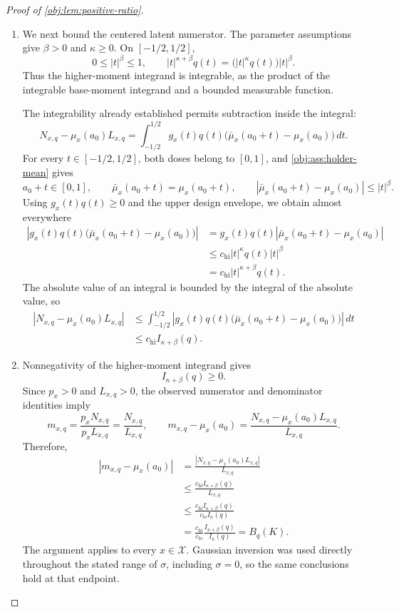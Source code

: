 \begin{proof}[Proof of \cref{obj:lem:positive-ratio}]
\begin{enumerate}
\item We next bound the centered latent numerator. The parameter assumptions give \(\beta>0\) and \(\kappa\ge0\). On \([-1/2,1/2]\),
\[
0\le |t|^\beta\le1,
\qquad
|t|^{\kappa+\beta}q(t)
=
\bigl(|t|^\kappa q(t)\bigr)|t|^\beta.
\]
Thus the higher-moment integrand is integrable, as the product of the integrable base-moment integrand and a bounded measurable function.

The integrability already established permits subtraction inside the integral:
\[
N_{x,q}-\mu_x(a_0)L_{x,q}
=
\int_{-1/2}^{1/2}
g_x(t)q(t)\bigl(\bar\mu_x(a_0+t)-\mu_x(a_0)\bigr)\,dt.
\]
For every \(t\in[-1/2,1/2]\), both doses belong to \([0,1]\), and \cref{obj:ass:holder-mean} gives
\[
a_0+t\in[0,1],
\qquad
\bar\mu_x(a_0+t)=\mu_x(a_0+t),
\qquad
|\bar\mu_x(a_0+t)-\mu_x(a_0)|\le |t|^\beta.
\]
Using \(g_x(t)q(t)\ge0\) and the upper design envelope, we obtain almost everywhere
\[
\begin{aligned}
\left|g_x(t)q(t)
\bigl(\bar\mu_x(a_0+t)-\mu_x(a_0)\bigr)\right|
&=g_x(t)q(t)
|\bar\mu_x(a_0+t)-\mu_x(a_0)|\\
&\le c_{\mathrm{hi}}|t|^\kappa q(t)|t|^\beta\\
&=c_{\mathrm{hi}}|t|^{\kappa+\beta}q(t).
\end{aligned}
\]
The absolute value of an integral is bounded by the integral of the absolute value, so
\[
\begin{aligned}
|N_{x,q}-\mu_x(a_0)L_{x,q}|
&\le
\int_{-1/2}^{1/2}
\left|g_x(t)q(t)
\bigl(\bar\mu_x(a_0+t)-\mu_x(a_0)\bigr)\right|\,dt\\
&\le c_{\mathrm{hi}}I_{\kappa+\beta}(q).
\end{aligned}
\]

\item Nonnegativity of the higher-moment integrand gives
\[
I_{\kappa+\beta}(q)\ge0.
\]
Since \(p_x>0\) and \(L_{x,q}>0\), the observed numerator and denominator identities imply
\[
m_{x,q}
=\frac{p_xN_{x,q}}{p_xL_{x,q}}
=\frac{N_{x,q}}{L_{x,q}},
\qquad
m_{x,q}-\mu_x(a_0)
=
\frac{N_{x,q}-\mu_x(a_0)L_{x,q}}{L_{x,q}}.
\]
Therefore,
\[
\begin{aligned}
|m_{x,q}-\mu_x(a_0)|
&=\frac{|N_{x,q}-\mu_x(a_0)L_{x,q}|}{L_{x,q}}\\
&\le\frac{c_{\mathrm{hi}}I_{\kappa+\beta}(q)}{L_{x,q}}\\
&\le\frac{c_{\mathrm{hi}}I_{\kappa+\beta}(q)}{c_{\mathrm{lo}}I_\kappa(q)}\\
&=\frac{c_{\mathrm{hi}}}{c_{\mathrm{lo}}}
\frac{I_{\kappa+\beta}(q)}{I_\kappa(q)}
=B_q(K).
\end{aligned}
\]
The argument applies to every \(x\in\mathcal X\). Gaussian inversion was used directly throughout the stated range of \(\sigma\), including \(\sigma=0\), so the same conclusions hold at that endpoint.
\end{enumerate}
\end{proof}
